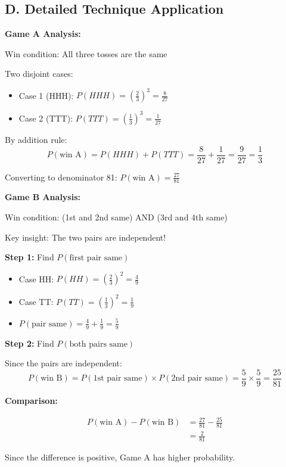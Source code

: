\documentclass[]{article}
\begin{document}
\begin{techniquesbox}
\subsection*{D. Detailed Technique Application}

\textbf{Game A Analysis:}

Win condition: All three tosses are the same

Two disjoint cases:
\begin{itemize}
    \item Case 1 (HHH): $P(HHH) = \left(\frac{2}{3}\right)^3 = \frac{8}{27}$
    \item Case 2 (TTT): $P(TTT) = \left(\frac{1}{3}\right)^3 = \frac{1}{27}$
\end{itemize}

By addition rule:
\[P(\text{win A}) = P(HHH) + P(TTT) = \frac{8}{27} + \frac{1}{27} = \frac{9}{27} = \frac{1}{3}\]

Converting to denominator 81: $P(\text{win A}) = \frac{27}{81}$

\textbf{Game B Analysis:}

Win condition: (1st and 2nd same) AND (3rd and 4th same)

Key insight: The two pairs are independent!

\textbf{Step 1:} Find $P(\text{first pair same})$
\begin{itemize}
    \item Case HH: $P(HH) = \left(\frac{2}{3}\right)^2 = \frac{4}{9}$
    \item Case TT: $P(TT) = \left(\frac{1}{3}\right)^2 = \frac{1}{9}$
    \item $P(\text{pair same}) = \frac{4}{9} + \frac{1}{9} = \frac{5}{9}$
\end{itemize}

\textbf{Step 2:} Find $P(\text{both pairs same})$

Since the pairs are independent:
\[P(\text{win B}) = P(\text{1st pair same}) \times P(\text{2nd pair same}) = \frac{5}{9} \times \frac{5}{9} = \frac{25}{81}\]

\textbf{Comparison:}

\begin{align*}
P(\text{win A}) - P(\text{win B}) &= \frac{27}{81} - \frac{25}{81}\\
&= \frac{2}{81}
\end{align*}

Since the difference is positive, Game A has higher probability.


\end{techniquesbox}
\end{document}
